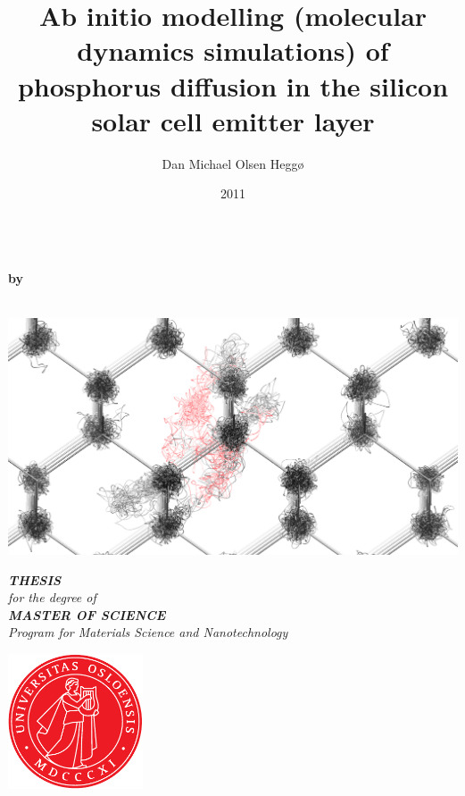 \documentclass[a4paper]{article}
\begin{document}
\title{Ab initio modelling (molecular dynamics simulations) of phosphorus diffusion in the silicon solar cell emitter layer}
\author{Dan Michael Olsen Heggø}
\date{2011}


\pagestyle{empty}
\begin{center}        %
  \LARGE
  \textbf{\thetitle} \\
  \Large
  \vspace{5mm}
  \textbf{by} \\
  \vspace{5mm}
  \large
  \textbf{\theauthor} \\
  \vspace{12mm}
  \centerline{\includegraphics[width=14cm]{dance1.png}}
  \vspace{12mm}
  \Large
  {\bf{\textsl{THESIS}}} \\
  \textsl{for the degree of} \\
  \vspace{2mm}
  {\bf{\textsl{MASTER OF SCIENCE}}} \\
  \vspace{2mm}
  {\large \textsl {Program for Materials Science and Nanotechnology}}\\
  \vspace{5mm}
  \centerline{\includegraphics[width=4cm,height=4cm]{apollonseglet_farge}}

\end{center}
\end{document}
